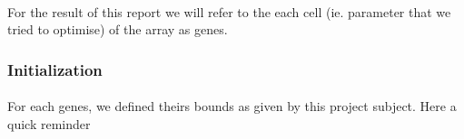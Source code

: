 \documentclass{article}
\begin{document}
      
      \paragraph{} %
      \label{par:}
        For the result of this report we will refer to the each cell (ie. parameter that
        we tried to optimise) of the array as genes.
    
    \subsubsection{Initialization} %
    \label{ssub:initialization}
      
      \paragraph{} %
      \label{par:}
        For each genes, we defined theirs bounds as given by this project subject.
        Here a quick reminder
      
\end{document}
